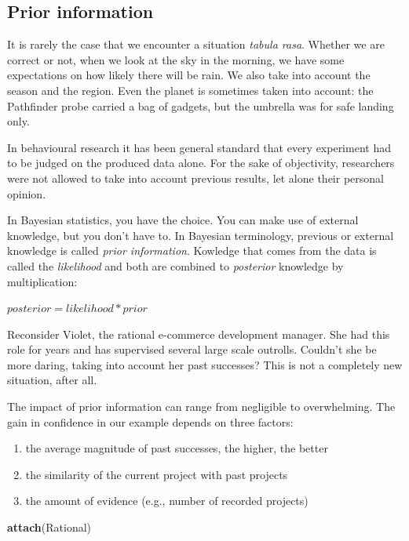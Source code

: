 \documentclass[]{svmono}
\newenvironment{Shaded}{\begin{snugshade}}{\end{snugshade}}
\newcommand{\KeywordTok}[1]{\textcolor[rgb]{0.13,0.29,0.53}{\textbf{#1}}}
\newcommand{\NormalTok}[1]{#1}
\providecommand{\tightlist}{%
  \setlength{\itemsep}{0pt}\setlength{\parskip}{0pt}}
\theoremstyle{definition}
\theoremstyle{definition}
\theoremstyle{definition}
\theoremstyle{remark}
\begin{document}
\subsection{Prior information}\label{prior-information}

It is rarely the case that we encounter a situation \emph{tabula rasa}.
Whether we are correct or not, when we look at the sky in the morning,
we have some expectations on how likely there will be rain. We also take
into account the season and the region. Even the planet is sometimes
taken into account: the Pathfinder probe carried a bag of gadgets, but
the umbrella was for safe landing only.

In behavioural research it has been general standard that every
experiment had to be judged on the produced data alone. For the sake of
objectivity, researchers were not allowed to take into account previous
results, let alone their personal opinion.

In Bayesian statistics, you have the choice. You can make use of
external knowledge, but you don't have to. In Bayesian terminology,
previous or external knowledge is called \emph{prior information}.
Kowledge that comes from the data is called the \emph{likelihood} and
both are combined to \emph{posterior} knowledge by multiplication:

\(posterior = likelihood * prior\)

Reconsider Violet, the rational e-commerce development manager. She had
this role for years and has supervised several large scale outrolls.
Couldn't she be more daring, taking into account her past successes?
This is not a completely new situation, after all.

The impact of prior information can range from negligible to
overwhelming. The gain in confidence in our example depends on three
factors:

\begin{enumerate}
\def\labelenumi{\arabic{enumi})}
\tightlist
\item
  the average magnitude of past successes, the higher, the better
\item
  the similarity of the current project with past projects
\item
  the amount of evidence (e.g., number of recorded projects)
\end{enumerate}

\begin{Shaded}
\begin{Highlighting}[]
\KeywordTok{attach}\NormalTok{(Rational)}
\end{Highlighting}
\end{Shaded}
\end{document}
